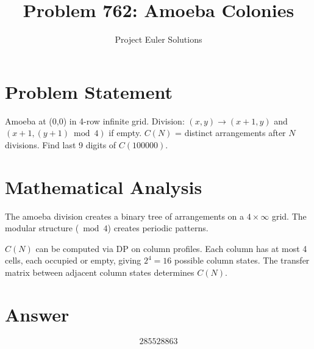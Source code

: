 \documentclass[11pt]{article}
\title{Problem 762: Amoeba Colonies}
\author{Project Euler Solutions}
\date{}
\begin{document}
\maketitle


\section{Problem Statement}
Amoeba at (0,0) in 4-row infinite grid. Division: $(x,y)\to (x+1,y)$ and $(x+1,(y+1)\bmod 4)$ if empty. $C(N)$ = distinct arrangements after $N$ divisions. Find last 9 digits of $C(100000)$.

\section{Mathematical Analysis}
The amoeba division creates a binary tree of arrangements on a $4\times\infty$ grid. The modular structure ($\bmod 4$) creates periodic patterns.

$C(N)$ can be computed via DP on column profiles. Each column has at most 4 cells, each occupied or empty, giving $2^4=16$ possible column states. The transfer matrix between adjacent column states determines $C(N)$.

\section{Answer}

\[
\boxed{285528863}
\]
\end{document}
